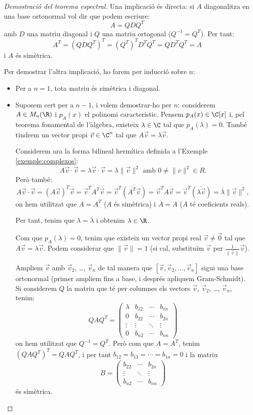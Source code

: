 \begin{proof}[Demostració del teorema espectral]
Una implicació és directa: si $A$ diagonalitza en una base ortonormal vol dir que podem escriure:
\[
A=Q D Q^T
\]
amb $D$ una matriu diagonal i $Q$ una matriu ortogonal ($Q^{-1}=Q^T$). Per tant:
\[
A^T=(QDQ^T)^T=(Q^T)^T D^T Q^T=Q D^T Q^T=A
\]
i $A$ és simètrica.

Per demostrar l'altra implicació, ho farem per inducció sobre $n$:
\begin{itemize}
    \item Per a $n=1$, tota matriu és simètrica i diagonal.
    \item Suposem cert per a $n-1$, i volem demostrar-ho per $n$: considerem $A\in M_n(\R)$ i $p_A(x)$ el polinomi característic. Pensem $p_A(x)\in\C[x]$ i, pel teorema fonamental de l'àlgebra, existeix $\lambda \in \C$ tal que $p_A(\lambda)=0$. També tindrem un vector propi $\vec v\in \C^n$ tal que $A \vec v=\lambda \vec v$.
    
    Considerem ara la forma bilineal hermítica definida a l'Exemple \ref{exemple:complexos}:
    \[
    A\vec v \cdot \vec v = \lambda \vec v \cdot \vec v= \lambda \|\vec v\|^2 \text{ amb $0\neq \|v\|^2\in R$}.
    \]
    Però també:
    \[
    A\vec v \cdot\vec  v = (A \vec v)^T \overline{\vec v} = \vec v^T A^T \overline{\vec v} = \vec v^T \overline{(\overline{A^T} \vec v)} = \vec v^T A \overline{\vec v} = \vec v^T (\overline{\lambda \vec v})=\overline{\lambda} \|\vec v\|^2 , 
    \]
    on hem utilitzat que $A=A^T$ ($A$ és simètrica) i $\overline A=A$ ($A$ té coeficients reals).
    
    Per tant, tenim que $\lambda=\overline{\lambda}$ i obtenim $\lambda \in \R$.
    
    Com que $p_A(\lambda)=0$, tenim que existeix un vector propi real $\vec v\neq \vec 0$ tal que $A\vec v=\lambda \vec v$. Podem considerar que $\|\vec v\|=1$ (si cal, substituïm $\vec v$ per $\frac{1}{\|\vec v\|}\vec v$).
    
    Ampliem $\vec v$ amb $\vec v_2$, \dots, $\vec v_n$ de tal manera que $[\vec v,\vec v_2, \dots ,\vec v_n]$ sigui una base ortonormal (primer ampliem fins a base, i després apliquem Gram-Schmidt). Si considerem $Q$ la matriu que té per columnes els vectors $\vec v$, $\vec v_2$, \ldots , $\vec v_n$, tenim:
    \[
    QAQ^T=\begin{pmatrix} \lambda & b_{12} & \cdots & b_{1n} \\
    0 & b_{22} & \cdots & b_{2n} \\
    \vdots & \vdots & \ddots & \vdots \\
    0 & b_{n2} & \cdots  & b_{nn}
    \end{pmatrix}
    \]
    on hem utilitzat que $Q^{-1}=Q^T$. Però com que $A=A^T$, tenim $(QAQ^T)^T=QAQ^T$, i per tant $b_{12}=b_{13}=\cdots=b_{1n}=0$ i la matriu
     \[
    B=\begin{pmatrix} b_{22} & \cdots & b_{2n} \\
    \vdots & \ddots & \vdots \\
    b_{n2} & \cdots  & b_{nn}
    \end{pmatrix}
    \]
    és simètrica.
    

\end{itemize}
\end{proof}
